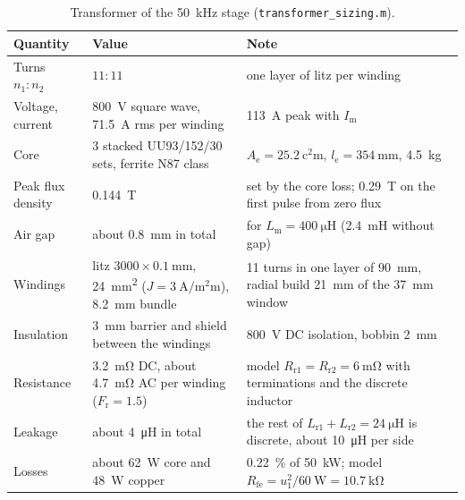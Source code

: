 \documentclass[12pt,a4paper]{scrartcl}
\newcommand{\ped}[1]{_{\mathrm{#1}}}
\newcommand{\code}[1]{\texttt{#1}}
\begin{document}
\begin{onehalfspace}
\begin{table}[H]
	\centering
	\captionsetup{width=0.9\textwidth, font=small}
	\caption[Transformer of the \SI{50}{\kilo\hertz} stage.]{Transformer of the \SI{50}{\kilo\hertz} stage (\code{transformer\_sizing.m}).}
	\label{tab:transformer}
	\begin{tabularx}{0.95\textwidth}{@{} l X X @{}}
		\toprule
		\textbf{Quantity} & \textbf{Value} & \textbf{Note} \\
		\midrule
		Turns $n\ped{1} : n\ped{2}$ & $11 : 11$ & one layer of litz per winding \\
		Voltage, current & \SI{800}{\volt} square wave, \SI{71.5}{\ampere} rms per winding & \SI{113}{\ampere} peak with $I\ped{m}$ \\
		Core & 3 stacked UU93/152/30 sets, ferrite N87 class & $A\ped{e} = \SI{25.2}{\square\centi\metre}$, $l\ped{e} = \SI{354}{\milli\metre}$, \SI{4.5}{\kilogram} \\
		Peak flux density & \SI{0.144}{\tesla} & set by the core loss; \SI{0.29}{\tesla} on the first pulse from zero flux \\
		Air gap & about \SI{0.8}{\milli\metre} in total & for $L\ped{m} = \SI{400}{\micro\henry}$ (\SI{2.4}{\milli\henry} without gap) \\
		Windings & litz $3000 \times \SI{0.1}{\milli\metre}$, \SI{24}{\square\milli\metre} ($J = \SI{3}{\ampere\per\square\milli\metre}$), \SI{8.2}{\milli\metre} bundle & 11 turns in one layer of \SI{90}{\milli\metre}, radial build \SI{21}{\milli\metre} of the \SI{37}{\milli\metre} window \\
		Insulation & \SI{3}{\milli\metre} barrier and shield between the windings & \SI{800}{\volt} DC isolation, bobbin \SI{2}{\milli\metre} \\
		Resistance & \SI{3.2}{\milli\ohm} DC, about \SI{4.7}{\milli\ohm} AC per winding ($F\ped{r} = 1.5$) & model $R\ped{r1} = R\ped{r2} = \SI{6}{\milli\ohm}$ with terminations and the discrete inductor \\
		Leakage & about \SI{4}{\micro\henry} in total & the rest of $L\ped{r1} + L\ped{r2} = \SI{24}{\micro\henry}$ is discrete, about \SI{10}{\micro\henry} per side \\
		Losses & about \SI{62}{\watt} core and \SI{48}{\watt} copper & \SI{0.22}{\percent} of \SI{50}{\kilo\watt}; model $R\ped{fe} = u\ped{1}^2/\SI{60}{\watt} = \SI{10.7}{\kilo\ohm}$ \\
		\bottomrule
	\end{tabularx}
\end{table}


\end{onehalfspace}
\end{document}

